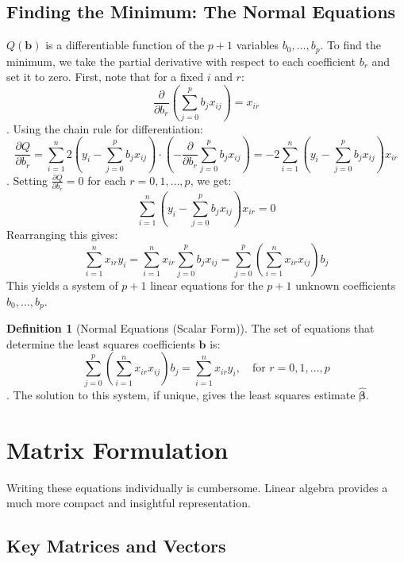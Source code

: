 \documentclass[11pt, letterpaper]{article}
\theoremstyle{definition}
\newtheorem{definition}{Definition}[section]
\newcommand{\vect}[1]{\mathbf{#1}} %
\begin{document}
\subsection{Finding the Minimum: The Normal Equations}

$Q(\vect{b})$ is a differentiable function of the $p+1$ variables $b_0, \dots, b_p$. To find the minimum, we take the partial derivative with respect to each coefficient $b_r$ and set it to zero.
First, note that for a fixed $i$ and $r$:
\[
\frac{\partial}{\partial b_r} \left( \sum_{j=0}^{p} b_j x_{ij} \right) = x_{ir}
\]. Using the chain rule for differentiation:
\[
\frac{\partial Q}{\partial b_r} = \sum_{i=1}^{n} 2 \left( y_i - \sum_{j=0}^{p} b_j x_{ij} \right) \cdot \left( - \frac{\partial}{\partial b_r} \sum_{j=0}^{p} b_j x_{ij} \right) = -2 \sum_{i=1}^{n} \left( y_i - \sum_{j=0}^{p} b_j x_{ij} \right) x_{ir}
\]. Setting $\frac{\partial Q}{\partial b_r} = 0$ for each $r = 0, 1, \dots, p$, we get:
\[
\sum_{i=1}^{n} \left( y_i - \sum_{j=0}^{p} b_j x_{ij} \right) x_{ir} = 0
\]
Rearranging this gives:
\[
\sum_{i=1}^{n} x_{ir} y_i = \sum_{i=1}^{n} x_{ir} \sum_{j=0}^{p} b_j x_{ij} = \sum_{j=0}^{p} \left( \sum_{i=1}^{n} x_{ir} x_{ij} \right) b_j
\]
This yields a system of $p+1$ linear equations for the $p+1$ unknown coefficients $b_0, \dots, b_p$.

\begin{definition}[Normal Equations (Scalar Form)]
The set of equations that determine the least squares coefficients $\vect{b}$ is:
\[
\sum_{j=0}^{p} \left( \sum_{i=1}^{n} x_{ir} x_{ij} \right) b_j = \sum_{i=1}^{n} x_{ir} y_i, \quad \text{for } r = 0, 1, \dots, p
\]. The solution to this system, if unique, gives the least squares estimate $\hat{\vect{\beta}}$.
\end{definition}

\section{Matrix Formulation}

Writing these equations individually is cumbersome. Linear algebra provides a much more compact and insightful representation.

\subsection{Key Matrices and Vectors}
\end{document}
